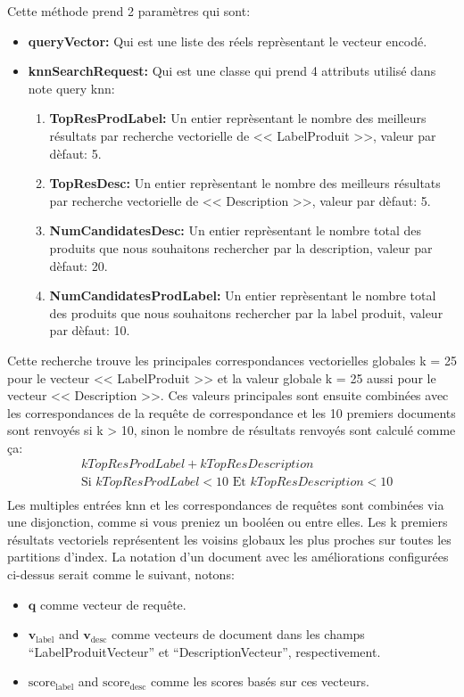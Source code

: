 \noindent
Cette méthode prend 2 paramètres qui sont:
\begin{itemize}
	\item \small\textbf{queryVector: } Qui est une liste des réels reprèsentant le vecteur encodé.
	\item \textbf{knnSearchRequest: } Qui est une classe qui prend 4 attributs utilisé dans note query knn:
	      \begin{enumerate}
		      \item \small\textbf{TopResProdLabel: } Un entier reprèsentant le nombre des meilleurs résultats par recherche vectorielle de << LabelProduit >>, valeur par dèfaut: 5.
		      \item \small\textbf{TopResDesc: } Un entier reprèsentant le nombre des meilleurs résultats par recherche vectorielle de << Description >>, valeur par dèfaut: 5.
		      \item \small\textbf{NumCandidatesDesc: } Un entier reprèsentant le nombre total des produits que nous souhaitons rechercher par la description, valeur par dèfaut: 20.
		      \item \small\textbf{NumCandidatesProdLabel: } Un entier reprèsentant le nombre total des produits que nous souhaitons rechercher par la label produit, valeur par dèfaut: 10.
	      \end{enumerate}

\end{itemize}

\noindent
Cette recherche trouve les principales correspondances vectorielles globales k = 25 pour le vecteur << LabelProduit >> et la valeur globale k = 25 aussi pour le vecteur << Description >>. Ces valeurs principales sont ensuite combinées avec les correspondances de la requête de correspondance et les 10 premiers documents sont renvoyés si k > 10, sinon le nombre de résultats renvoyés sont calculé comme ça:\[
	\begin{aligned}
		 & kTopResProdLabel + kTopResDescription                                \\
		 & \text{Si } kTopResProdLabel < 10 \text{ Et } kTopResDescription < 10 \\
	\end{aligned}
\]
Les multiples entrées knn et les correspondances de requêtes sont combinées via une disjonction, comme si vous preniez un booléen ou entre elles. Les k premiers résultats vectoriels représentent les voisins globaux les plus proches sur toutes les partitions d'index.
\noindent
La notation d'un document avec les améliorations configurées ci-dessus serait comme le suivant, notons:
\begin{itemize}
	\item \( \mathbf{q} \) comme vecteur de requête.
	\item \( \mathbf{v}_{\text{label}} \) and \( \mathbf{v}_{\text{desc}} \) comme vecteurs de document dans les champs ``LabelProduitVecteur'' et ``DescriptionVecteur'', respectivement.
	\item \( \text{score}_{\text{label}} \) and \( \text{score}_{\text{desc}} \) comme les scores basés sur ces vecteurs.
\end{itemize}

